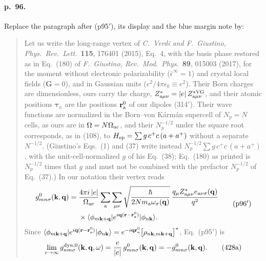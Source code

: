 \documentclass[11pt]{article}
\begin{document}
\paragraph{p.~96.} Replace the paragraph after (p95$'$), its display and the blue margin note by:
\begin{quote}
Let us write the long-range vertex of \textit{C.~Verdi and F.~Giustino, Phys.\ Rev.\ Lett.}\ \textbf{115},
176401 (2015), Eq.~4, with the basis phase restored as in Eq.~(180) of \textit{F.~Giustino, Rev.\ Mod.\
Phys.}\ \textbf{89}, 015003 (2017), for the moment without electronic polarizability
($\hat\epsilon^\infty=1$) and crystal local fields ($\mathbf G=0$), and in Gaussian units
($e^2/4\pi\epsilon_0\equiv e^2$). Their Born charges are dimensionless, ours carry the charge,
$Z^*_{{\rm a}\mu\nu}=|e|\,Z^{*\rm VG}_{{\rm a}\mu\nu}$, and their atomic positions $\bm{\tau}_\kappa$ are the
positions $\mathbf r^0_{\rm a}$ of our dipoles (314$'$). Their wave functions are normalized in the
Born--von K\'arm\'an supercell of $N_p=N$ cells, as ours are in $\Omega=N\Omega_{\rm uc}$, and their
$N_p^{-1/2}$ under the square root corresponds, as in (108), to $H_{\rm ep}=\sum g\,c^+c\,(a+a^+)$ without a
separate $N^{-1/2}$. (Giustino's Eqs.~(1) and (37) write instead $N_p^{-1/2}\sum g\,c^+c\,(a+a^+)$, with the
unit-cell-normalized $g$ of his Eq.~(38); Eq.~(180) as printed is $N_p^{-1/2}$ times that $g$ and must not
be combined with the prefactor $N_p^{-1/2}$ of Eq.~(37).) In our notation their vertex reads
\begin{equation*}
\begin{split}
g^0_{mn\sigma}(\mathbf k,\mathbf q)={}&\frac{4\pi i\,|e|}{\Omega_{\rm uc}}\sum_{\rm a}\sum_{\mu\nu}
\sqrt{\frac{\hbar}{2Nm_{\rm a}\omega_\sigma(\mathbf q)}}\,
\frac{q_\mu Z^*_{{\rm a}\mu\nu}e_{{\rm a}\nu\sigma}(\mathbf q)}{q^2}\\
&\times\langle\phi_{m\mathbf k+\mathbf q}|e^{i\mathbf q(\mathbf r-\mathbf r^0_{\rm a})}|\phi_{n\mathbf k}\rangle .
\end{split}
\tag{p96$'$}
\end{equation*}
Since $\langle\phi_{m\mathbf k+\mathbf q}|e^{i\mathbf q(\mathbf r-\mathbf r^0_{\rm a})}|\phi_{n\mathbf k}\rangle
=e^{-i\mathbf q\mathbf r^0_{\rm a}}\big[\rho_{n\mathbf k,m\mathbf k+\mathbf q}\big]^*$, Eq.~(p95$'$) is
\begin{equation*}
\lim_{c\to\infty}g^{\rm dyn,0}_{nm\sigma}(\mathbf k,\mathbf q,\omega)=\frac{e}{|e|}\,g^0_{mn\sigma}(\mathbf k,\mathbf q)
=-g^0_{mn\sigma}(\mathbf k,\mathbf q).
\tag{428a}
\end{equation*}

\end{quote}
\end{document}
